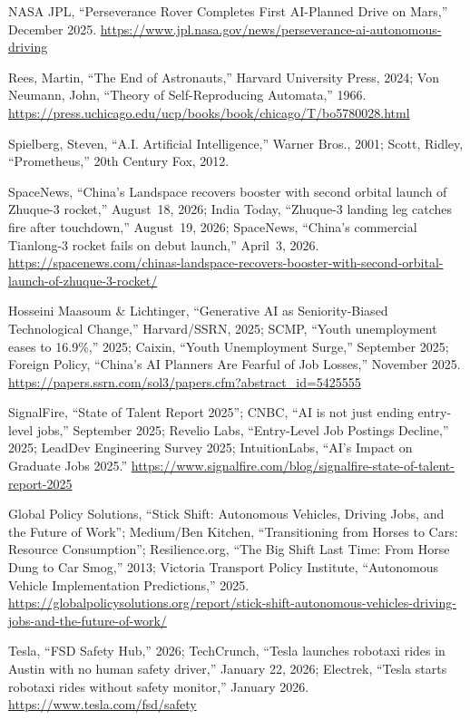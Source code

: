 \documentclass[11pt,a4paper]{article}
\begin{document}
\noindent [77] NASA JPL, ``Perseverance Rover Completes First AI-Planned Drive on Mars,'' December 2025. \url{https://www.jpl.nasa.gov/news/perseverance-ai-autonomous-driving}

\noindent [78] Rees, Martin, ``The End of Astronauts,'' Harvard University Press, 2024; Von Neumann, John, ``Theory of Self-Reproducing Automata,'' 1966. \url{https://press.uchicago.edu/ucp/books/book/chicago/T/bo5780028.html}

\noindent [79] Spielberg, Steven, ``A.I. Artificial Intelligence,'' Warner Bros., 2001; Scott, Ridley, ``Prometheus,'' 20th Century Fox, 2012.

\noindent [80] SpaceNews, ``China's Landspace recovers booster with second orbital launch of Zhuque-3 rocket,'' August~18, 2026; India Today, ``Zhuque-3 landing leg catches fire after touchdown,'' August~19, 2026; SpaceNews, ``China's commercial Tianlong-3 rocket fails on debut launch,'' April~3, 2026. \url{https://spacenews.com/chinas-landspace-recovers-booster-with-second-orbital-launch-of-zhuque-3-rocket/}

\noindent [81] Hosseini Maasoum \& Lichtinger, ``Generative AI as Seniority-Biased Technological Change,'' Harvard/SSRN, 2025; SCMP, ``Youth unemployment eases to 16.9\%,'' 2025; Caixin, ``Youth Unemployment Surge,'' September 2025; Foreign Policy, ``China's AI Planners Are Fearful of Job Losses,'' November 2025. \url{https://papers.ssrn.com/sol3/papers.cfm?abstract_id=5425555}

\noindent [82] SignalFire, ``State of Talent Report 2025''; CNBC, ``AI is not just ending entry-level jobs,'' September 2025; Revelio Labs, ``Entry-Level Job Postings Decline,'' 2025; LeadDev Engineering Survey 2025; IntuitionLabs, ``AI's Impact on Graduate Jobs 2025.'' \url{https://www.signalfire.com/blog/signalfire-state-of-talent-report-2025}

\noindent [83] Global Policy Solutions, ``Stick Shift: Autonomous Vehicles, Driving Jobs, and the Future of Work''; Medium/Ben Kitchen, ``Transitioning from Horses to Cars: Resource Consumption''; Resilience.org, ``The Big Shift Last Time: From Horse Dung to Car Smog,'' 2013; Victoria Transport Policy Institute, ``Autonomous Vehicle Implementation Predictions,'' 2025. \url{https://globalpolicysolutions.org/report/stick-shift-autonomous-vehicles-driving-jobs-and-the-future-of-work/}

\noindent [84] Tesla, ``FSD Safety Hub,'' 2026; TechCrunch, ``Tesla launches robotaxi rides in Austin with no human safety driver,'' January 22, 2026; Electrek, ``Tesla starts robotaxi rides without safety monitor,'' January 2026. \url{https://www.tesla.com/fsd/safety}
\end{document}
